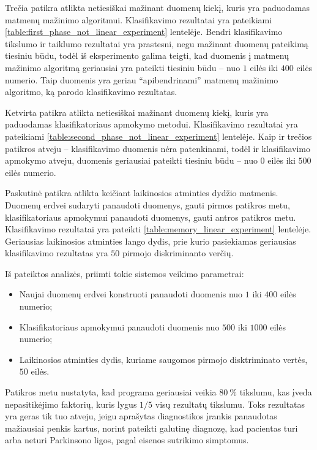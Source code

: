 \documentclass[]{vgtuef}
\begin{document}
Trečia patikra atlikta netiesiškai mažinant duomenų kiekį, kuris yra paduodamas matmenų mažinimo algoritmui. Klasifikavimo rezultatai yra pateikiami \ref{table:first_phase_not_linear_experiment} lentelėje. Bendri klasifikavimo tikslumo ir taiklumo rezultatai yra prastesni, negu mažinant duomenų pateikimą tiesiniu būdu, todėl iš eksperimento galima teigti, kad duomenis į matmenų mažinimo algoritmą geriausiai yra pateikti tiesiniu būdu -- nuo $1$ eilės iki $400$ eilės numerio. Taip duomenis yra geriau ``apibendrinami'' matmenų mažinimo algoritmo, ką parodo klasifikavimo rezultatas.

Ketvirta patikra atlikta netiesiškai mažinant duomenų kiekį, kuris yra paduodamas klasifikatoriaus apmokymo metodui. Klasifikavimo rezultatai yra pateikiami \ref{table:second_phase_not_linear_experiment} lentelėje. Kaip ir trečios patikros atveju -- klasifikavimo duomenis nėra patenkinami, todėl ir klasifikavimo apmokymo atveju, duomenis geriausiai pateikti tiesiniu būdu -- nuo $0$  eilės iki $500$ eilės numerio.

Paskutinė patikra atlikta keičiant laikinosios atminties dydžio matmenis. Duomenų erdvei sudaryti panaudoti duomenys, gauti pirmos patikros metu, klasifikatoriaus apmokymui panaudoti duomenys, gauti antros patikros metu. Klasifikavimo rezultatai yra pateikti \ref{table:memory_linear_experiment} lentelėje. Geriausias laikinosios atminties lango dydis, prie kurio pasiekiamas geriausias klasifikavimo rezultatas yra $50$ pirmojo diskriminanto verčių.

Iš pateiktos analizės, priimti tokie sistemos veikimo parametrai:
\begin{itemize}
\item Naujai duomenų erdvei konstruoti panaudoti duomenis nuo $1$ iki $400$ eilės numerio;
\item Klasifikatoriaus apmokymui panaudoti duomenis nuo $500$ iki $1000$ eilės numerio;
\item Laikinosios atminties dydis, kuriame saugomos pirmojo disktriminato vertės, $50$ eilės.
\end{itemize}

Patikros metu nustatyta, kad programa geriausiai veikia $80~\%$ tikslumu, kas įveda nepasitikėjimo faktorių, kuris lygus $1/5$ visų rezultatų tikslumu. Toks rezultatas yra geras tik tuo atveju, jeigu aprašytas diagnostikos įrankis panaudotas mažiausiai penkis kartus, norint pateikti galutinę diagnozę, kad pacientas turi arba neturi Parkinsono ligos, pagal eisenos sutrikimo simptomus.
\end{document}
